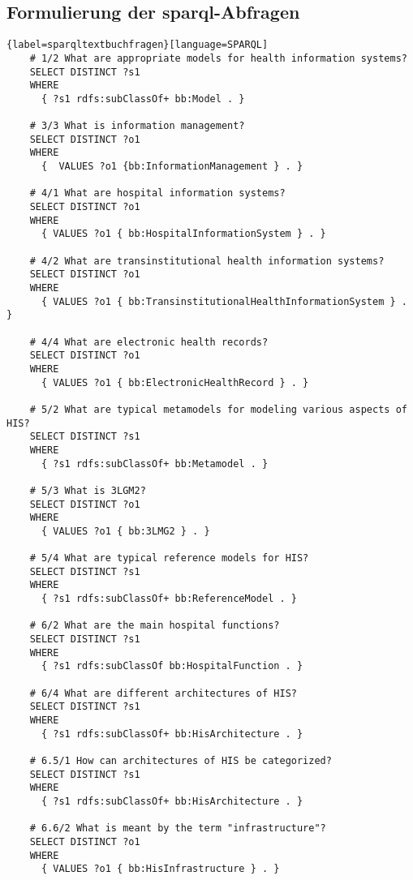 \subsection[Formulierung der SPARQL-Abfragen]{Formulierung der \ac{sparql}-Abfragen}\label{sub:sparqltextbuchfragen}

\begin{lstlisting}{label=sparqltextbuchfragen}[language=SPARQL]
    # 1/2 What are appropriate models for health information systems?
    SELECT DISTINCT ?s1
    WHERE
      { ?s1 rdfs:subClassOf+ bb:Model . }
    
    # 3/3 What is information management?
    SELECT DISTINCT ?o1
    WHERE
      {  VALUES ?o1 {bb:InformationManagement } . }
    
    # 4/1 What are hospital information systems?
    SELECT DISTINCT ?o1
    WHERE
      { VALUES ?o1 { bb:HospitalInformationSystem } . }
    
    # 4/2 What are transinstitutional health information systems?
    SELECT DISTINCT ?o1
    WHERE
      { VALUES ?o1 { bb:TransinstitutionalHealthInformationSystem } . }
    
    # 4/4 What are electronic health records?
    SELECT DISTINCT ?o1
    WHERE
      { VALUES ?o1 { bb:ElectronicHealthRecord } . }
    
    # 5/2 What are typical metamodels for modeling various aspects of HIS?
    SELECT DISTINCT ?s1
    WHERE
      { ?s1 rdfs:subClassOf+ bb:Metamodel . }
    
    # 5/3 What is 3LGM2?
    SELECT DISTINCT ?o1
    WHERE
      { VALUES ?o1 { bb:3LMG2 } . }
    
    # 5/4 What are typical reference models for HIS?
    SELECT DISTINCT ?s1
    WHERE
      { ?s1 rdfs:subClassOf+ bb:ReferenceModel . }
    
    # 6/2 What are the main hospital functions?
    SELECT DISTINCT ?s1
    WHERE
      { ?s1 rdfs:subClassOf bb:HospitalFunction . }
    
    # 6/4 What are different architectures of HIS?
    SELECT DISTINCT ?s1
    WHERE
      { ?s1 rdfs:subClassOf+ bb:HisArchitecture . }
    
    # 6.5/1 How can architectures of HIS be categorized?
    SELECT DISTINCT ?s1
    WHERE
      { ?s1 rdfs:subClassOf+ bb:HisArchitecture . }
    
    # 6.6/2 What is meant by the term "infrastructure"?
    SELECT DISTINCT ?o1
    WHERE
      { VALUES ?o1 { bb:HisInfrastructure } . }
    

\end{lstlisting}

